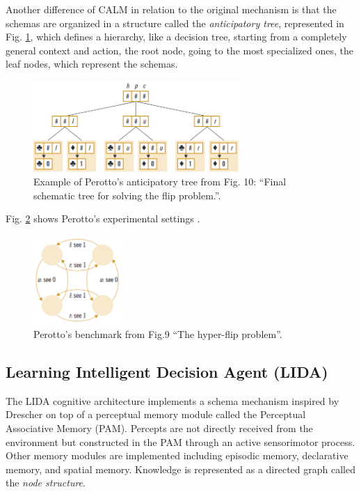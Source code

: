 \documentclass[runningheads]{llncs}
\begin{document}
Another difference of CALM in relation to the original mechanism is that the schemas are organized in a structure called the \textit{anticipatory tree}, represented in Fig. \ref{fig:perotto_tree}, which defines a hierarchy, like a decision tree, starting from a completely general context and action, the root node, going to the most specialized ones, the leaf nodes, which represent the schemas.

\begin{figure}
	\centering
	\includegraphics[width=0.7\textwidth]{Figure_perotto_tree.png}
	\caption{Example of Perotto's anticipatory tree from \cite{Perotto:2013:CF} Fig. 10: ``Final schematic tree for solving the flip problem.''.
 } 
	\label{fig:perotto_tree}
\end{figure}

Fig. \ref{fig:perotto_ben} shows Perotto's experimental settings \cite{Perotto:2013:CF}.

\begin{figure}
	\centering
	\includegraphics[width=0.3\textwidth]{Figure_perotto_benchmark.png}
	\caption{Perotto's benchmark from \cite{Perotto:2013:CF} Fig.9 ``The hyper-flip problem''.} 
	\label{fig:perotto_ben}
\end{figure}




\subsection{Learning Intelligent Decision Agent (LIDA)}

The LIDA cognitive architecture \cite{kugele_learning_2021}  implements a schema mechanism inspired by Drescher on top of a perceptual memory module called the Perceptual Associative Memory (PAM). 
Percepts are not directly received from the environment but constructed in the PAM through an active sensorimotor process. 
Other memory modules are implemented including episodic memory, declarative memory, and spatial memory.
Knowledge is represented as a directed graph called the \textit{node structure}. 
\end{document}
